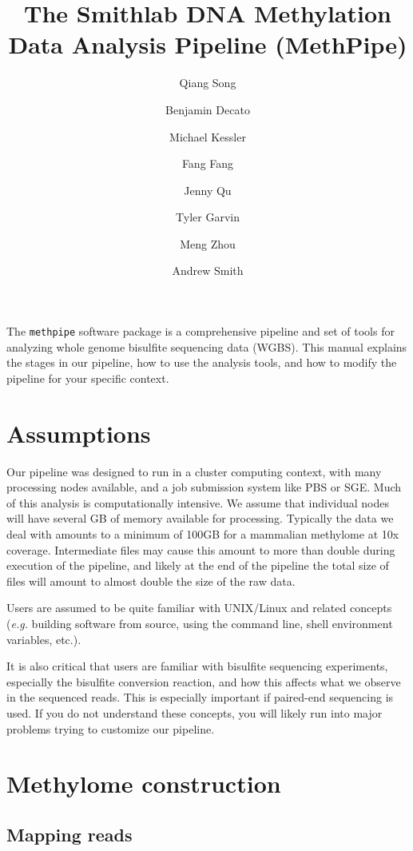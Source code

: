 \documentclass[10pt]{article}
\title{The Smithlab DNA Methylation Data Analysis Pipeline (MethPipe)}
\author{Qiang Song \and Benjamin Decato \and Michael Kessler \and Fang Fang
\and Jenny Qu \and Tyler Garvin \and Meng Zhou \and Andrew Smith}
\newcommand{\meth}{\texttt{methpipe}}
\begin{document}
\maketitle
\tableofcontents

The \meth{} software package is a comprehensive pipeline and set of
tools for analyzing whole genome bisulfite sequencing data
(WGBS). This manual explains the stages in our pipeline, how to use
the analysis tools, and how to modify the pipeline for your specific
context.

\newpage


\section{Assumptions}

Our pipeline was designed to run in a cluster computing context, with
many processing nodes available, and a job submission system like PBS
or SGE. Much of this analysis is computationally intensive. We assume
that individual nodes will have several GB of memory available for
processing. Typically the data we deal with amounts to a minimum of
100GB for a mammalian methylome at 10x coverage. Intermediate files
may cause this amount to more than double during execution of the
pipeline, and likely at the end of the pipeline the total size of
files will amount to almost double the size of the raw data.

Users are assumed to be quite familiar with UNIX/Linux and related
concepts ({\em e.g.} building software from source, using the command
line, shell environment variables, etc.).

It is also critical that users are familiar with bisulfite sequencing
experiments, especially the bisulfite conversion reaction, and how this 
affects what we observe in the sequenced reads. This is especially important
if paired-end sequencing is used. If you do not understand these
concepts, you will likely run into major problems trying to customize our 
pipeline.

\section{Methylome construction}

\subsection{Mapping reads}
\label{sec:mapping}

\end{document}
